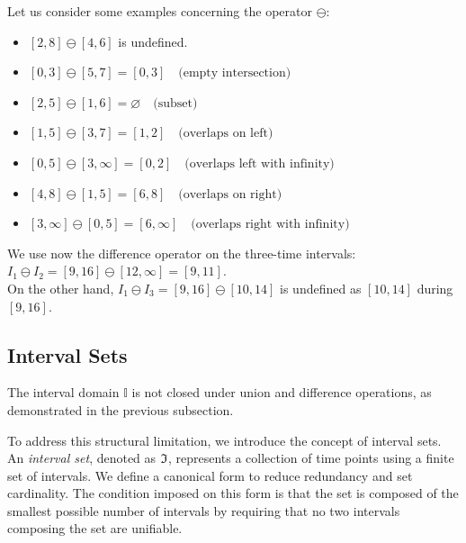 \begin{example}

Let us consider some examples concerning the operator $\ominus$:

    \begin{itemize}
    \item $
    [2, 8] \ominus [4, 6] $ is undefined.

    \item $
    [0, 3] \ominus [5, 7] = [0, 3] \quad \text{(empty intersection)}$
    \item $
    [2, 5] \ominus [1, 6] = \varnothing \quad \text{(subset)}
    $
    \item $[1, 5] \ominus [3, 7] = [1, 2] \quad \text{(overlaps on left)}$
    \item $[0, 5] \ominus [3, \infty] = [0, 2] \quad \text{(overlaps left with infinity)}$
    \item $[4, 8] \ominus [1, 5] = [6, 8] \quad \text{(overlaps on right)}$
    \item $[3, \infty] \ominus [0, 5] = [6, \infty] \quad \text{(overlaps right with infinity)}$
\end{itemize}


We use now the difference operator on the three-time intervals:\\
$I_1 \ominus I_2 = [9,16]\ominus [12,\infty]= [9,11]$. \\
On the other hand,
$I_1 \ominus I_3 = [9,16] \ominus [10,14]$ is undefined as $[10,14]$ during $[9,16]$.

\end{example}

\subsection{Interval Sets}
The interval domain $\mathbb{I}$ is not closed under union and difference operations, as demonstrated in the previous subsection.

To address this structural limitation, we introduce the concept of interval sets. An \emph{interval set}, denoted as $\mathfrak{I}$, represents a collection of time points using a finite set of intervals. We define a canonical form to reduce redundancy and set cardinality. The condition imposed on this form is that the set is composed of the smallest possible number of intervals by requiring that no two intervals composing the set are unifiable.


